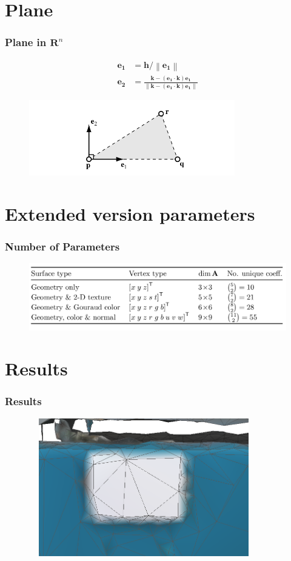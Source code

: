 \documentclass[
	10pt,
	t		%
]{beamer}
\newcommand{\norm}[1]{\left\lVert#1\right\rVert}
\begin{document}
\section{Plane}
\begin{frame}
\frametitle{Plane in $\mathbf{R}^n$}
\centering
\begin{align}
\mathbf{e_1} &= \mathbf{h} / \norm{\mathbf{e_1}} \\
\mathbf{e_2} &= \frac{\mathbf{k} - (\mathbf{e_1} \cdot \mathbf{k})\mathbf{e_1}}{\norm{\mathbf{k} - (\mathbf{e_1} \cdot \mathbf{k})\mathbf{e_1}}}
\end{align}
\begin{figure}[ht]
\centering
\includegraphics[width=0.8\textwidth]{gram}
\end{figure}
\end{frame}

\section{Extended version parameters}
\begin{frame}
\frametitle{Number of Parameters}
\centering
\begin{figure}[ht]
\centering
\includegraphics[width=1\textwidth]{params_table}
\end{figure}
\end{frame}

\section{Results}
\begin{frame}
\frametitle{Results}
\centering
\begin{figure}[ht]
\centering
\includegraphics[width=10cm,height=6cm]{color_2}
\end{figure}
\end{frame}
\end{document}
